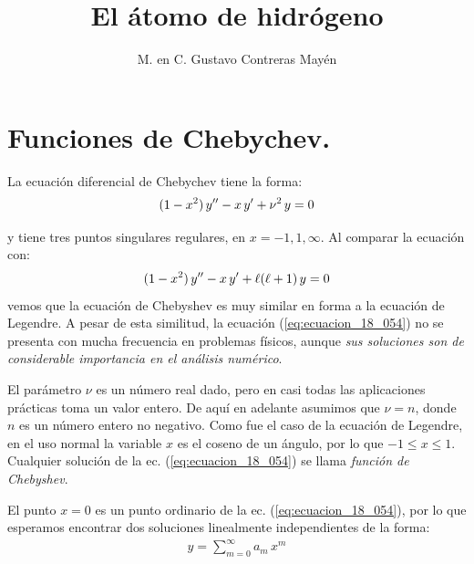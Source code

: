 
\title{El átomo de hidrógeno} \vspace{-3ex}
\author{M. en C. Gustavo Contreras Mayén}
\date{ }
\newcommand{\Cancel}[2][black]{{\color{#1}\cancel{\color{black}#2}}}

\vspace{-4cm}
\maketitle
\fontsize{14}{14}\selectfont
\tableofcontents
\newpage

\section{Funciones de Chebychev.}

La ecuación diferencial de Chebychev tiene la forma:
\begin{align}
(1 - x^{2}) \, {y}^{\prime \prime} - x \, {y}^{\prime} + \nu^{2} \, y
 = 0
 \label{eq:ecuacion_18_054}
\end{align}

y tiene tres puntos singulares regulares, en $x = -1, 1, \infty$. Al comparar la ecuación con:
\begin{align*}
(1 - x^{2}) \, {y}^{\prime \prime} - x \, {y}^{\prime} + \ell (\ell + 1) \, y = 0
\end{align*}
vemos que la ecuación de Chebyshev es muy similar en forma a la ecuación de Legendre. A pesar de esta similitud, la ecuación (\ref{eq:ecuacion_18_054}) no se presenta con mucha frecuencia en problemas físicos, aunque \emph{sus soluciones son de considerable importancia en el análisis numérico}.
\par
El parámetro $\nu$ es un número real dado, pero en casi todas las aplicaciones prácticas toma un valor entero. De aquí en adelante asumimos que $\nu = n$, donde $n$ es un número entero no negativo. Como fue el caso de la ecuación de Legendre, en el uso normal la variable $x$ es el coseno de un ángulo, por lo que $-1 \leq x \leq 1$. Cualquier solución de la ec. (\ref{eq:ecuacion_18_054}) se llama \emph{función de Chebyshev}.
\par
El punto $x = 0$ es un punto ordinario de la ec. (\ref{eq:ecuacion_18_054}), por lo que esperamos encontrar
dos soluciones linealmente independientes de la forma:
\begin{align*}
y = \sum_{m=0}^{\infty} a_{m} \, x^{m}
\end{align*}

